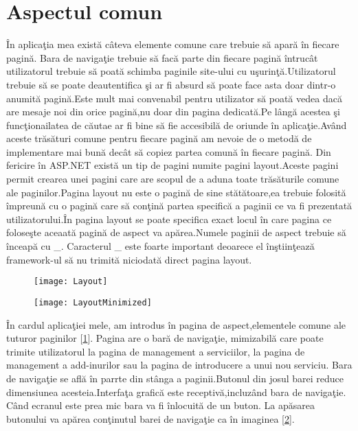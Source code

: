 \documentclass[a4paper,12pt]{report}
\let\oldref\ref
\renewcommand{\ref}[1]{[\oldref{#1}]}
\begin{document}
\section{Aspectul comun}

\^In aplica\c tia mea exist\u a c\^ateva elemente comune care trebuie s\u a apar\u a \^in fiecare pagin\u a.
Bara de naviga\c tie trebuie s\u a fac\u a parte din fiecare pagin\u a \^intruc\^at utilizatorul trebuie 
s\u a poat\u a schimba paginile site-ului cu u\c surin\c t\u a.Utilizatorul trebuie s\u a se poate 
deautentifica \c si ar fi absurd s\u a poate face asta doar dintr-o anumit\u a pagin\u a.Este mult mai 
convenabil pentru utilizator s\u a poat\u a vedea dac\u a are mesaje noi din orice pagin\u a,nu doar 
din pagina dedicat\u a.Pe l\^ang\u a acestea \c si func\c tionailatea de c\u autae ar fi bine s\u a fie accesibil\u a
de oriunde \^in aplica\c tie.Av\^and aceste tr\u as\u aturi comune pentru fiecare pagin\u a am nevoie de 
o metod\u a de implementare mai bun\u a dec\^at s\u a copiez partea comun\u a \^in fiecare pagin\u a.
Din fericire \^in ASP.NET exist\u a un tip de pagini numite pagini layout.Aceste pagini permit crearea 
unei pagini care are scopul de a aduna toate tr\u as\u aturile comune ale paginilor.Pagina layout nu este o pagin\u a de sine
st\u at\u atoare,ea trebuie folosit\u a \^impreun\u a cu o pagin\u a care s\u a con\c tin\u a partea specific\u a 
a paginii ce va fi prezentat\u a utilizatorului.\^In pagina layout se poate specifica exact locul \^in care pagina
ce folose\c ste aceaat\u a pagin\u a de aspect va ap\u area.Numele paginii de aspect trebuie s\u a \^inceap\u a cu \_.
Caracterul \_ este foarte important deoarece el \^in\c stiin\c teaz\u a framework-ul s\u a nu trimit\u a niciodat\u a
direct pagina layout. 

\begin{figure}[!htb]
	\texttt{[image: Layout]}
	\label{fig:Layout}
\end{figure}

\begin{figure}[!htb]
	\texttt{[image: LayoutMinimized]}
	\label{fig:LayoutMinimized}
\end{figure}

\^In cardul aplica\c tiei mele, am introdus \^in pagina de aspect,elementele comune ale tuturor paginilor \ref{fig:Layout}.
Pagina are o bar\u a de naviga\c tie, mimizabil\u a care poate trimite utilizatorul la pagina de management a
serviciilor, la pagina de management a add-inurilor sau la pagina de introducere a unui nou serviciu.
Bara de naviga\c tie se afl\u a \^in parrte din st\^anga a paginii.Butonul din josul barei reduce dimensiunea
acesteia.Interfa\c ta grafic\u a este receptiv\u a,incluz\^and bara de naviga\c tie. C\^and ecranul este prea mic
bara va fi \^inlocuit\u a de un buton. La ap\u asarea butonului va ap\u area con\c tinutul barei de naviga\c tie
ca \^in imaginea \ref{fig:LayoutMinimized}.
\end{document}
